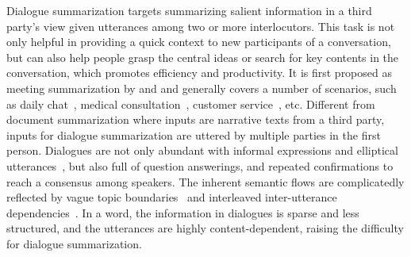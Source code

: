 Dialogue summarization targets summarizing salient information in a third party's view given utterances among two or 
more interlocutors. 
This task is not only helpful in providing a quick context to new participants of a conversation, 
but can also help people grasp the central ideas or search for key contents in the conversation, which promotes efficiency and
productivity. 
It is first proposed as meeting summarization by \citet{carletta2005ami} and \citet{janin2003icsi} and generally
covers a number of scenarios, such as daily chat~\cite{gliwa2019samsum,chen2021dialsumm}, 
medical consultation~\cite{joshi2020dr}, customer service~\cite{zou2021topic}, etc.
Different from document summarization where inputs are narrative texts from a third party, inputs for dialogue summarization are uttered by multiple parties in the first person. %
Dialogues are not only abundant with informal expressions and elliptical utterances~\cite{zhang2020filling,liu2020incomplete},
but also full of question answerings, and repeated confirmations to reach a consensus among speakers.
The inherent semantic flows are complicatedly reflected by vague topic boundaries~\cite{takanobu2018weakly} and
interleaved inter-utterance dependencies~\cite{afantenos2015discourse}. %
In a word, the information in dialogues is sparse and less structured, and the utterances are highly content-dependent, raising the difficulty for dialogue summarization.



